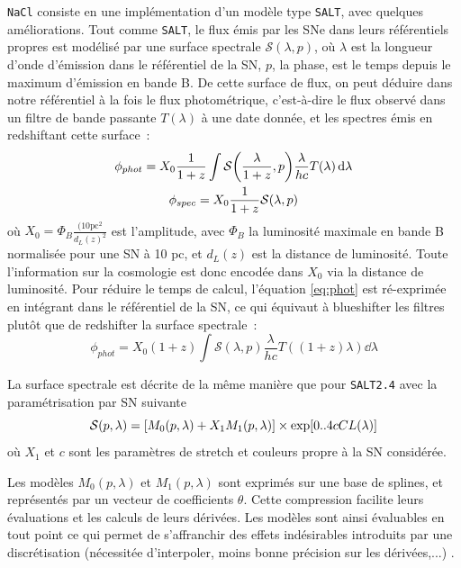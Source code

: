 \documentclass{book}
\def\nacl{\texttt{NaCl}\xspace}
\def\saltd{\texttt{SALT2.4}\xspace}
\let\mcl\mathcal
\begin{document}
\nacl consiste en une implémentation d'un modèle type \texttt{SALT}, avec quelques améliorations. Tout comme \texttt{SALT}, le flux émis par les SNe dans leurs référentiels propres est modélisé par une surface spectrale $\mcl S(\lambda, p)$, où $\lambda$ est la longueur d'onde d'émission dans le référentiel de la SN, $p$, la phase, est le temps depuis le maximum d'émission en bande B.
De cette surface de flux, on peut déduire dans notre référentiel à la fois le flux photométrique, c'est-à-dire le flux observé dans un filtre de bande passante $T(\lambda)$ à une date donnée, et les spectres émis en redshiftant cette surface~:
\begin{gather}
	\phi_{phot} = X_0 \frac{1}{1+z} \int \mcl S\qty(\frac{\lambda}{1+z}, p) \frac{\lambda}{hc} T(\lambda) \dd{\lambda} \label{eq:phot}\\
	\phi_{spec}  = X_0 \frac{1}{1+z} \mcl S(\lambda, p) \label{eq:spec}
\end{gather}
où $X_0 = \Phi_B \frac{(10\text{pc}^2}{d_L(z)^2}$ est l'amplitude, avec $\Phi_B$ la luminosité maximale en bande B normalisée pour une SN à 10 pc, et $d_L(z)$ est la distance de luminosité. Toute l'information sur la cosmologie est donc encodée dans $X_0$ via la distance de luminosité.
Pour réduire le temps de calcul, l'équation \ref{eq:phot} est ré-exprimée en intégrant dans le référentiel de la SN, ce qui équivaut à blueshifter les filtres plutôt que de redshifter la surface spectrale~:
\begin{equation}
	\phi_{phot} = X_0 (1+z) \int \mcl S(\lambda, p) \frac{\lambda}{hc} T((1+z)\lambda) \dd{\lambda}
\end{equation}

La surface spectrale est décrite de la même manière que pour \saltd avec la paramétrisation par SN suivante
\begin{equation}
    \mcl S (p, \lambda) = \qty[M_0(p, \lambda) + X_1 M_1(p, \lambda)] \times \exp[0..4 c CL(\lambda)]
\end{equation}
où $X_1$ et $c$ sont les paramètres de stretch et couleurs propre à la SN considérée.

Les modèles $M_0(p, \lambda)$ et $M_1(p, \lambda)$ sont exprimés sur une base de splines, et représentés par un vecteur de coefficients $\theta$. Cette compression facilite leurs évaluations et les calculs de leurs dérivées. Les modèles sont ainsi évaluables en tout point ce qui permet de s'affranchir des effets indésirables introduits par une discrétisation (nécessitée d'interpoler, moins bonne précision sur les dérivées,...) .
\end{document}
